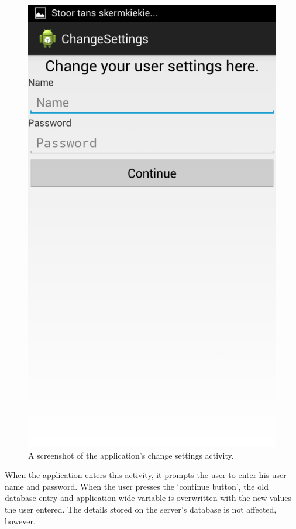 \begin{figure}
 \centering 
 \includegraphics[clip = true, trim = 0 680 0 60,
 scale=0.2]{settings_screenshot}
 \caption{A screenshot of the application's change settings activity.}
 \label{fig:change-settings-screenshot}
\end{figure}

When the application enters this activity, it prompts the user to enter his user
name and password. When the user presses the `continue button', the old database
entry and application-wide variable is overwritten with the new values the user entered.
The details stored on the server's database is not affected, however.